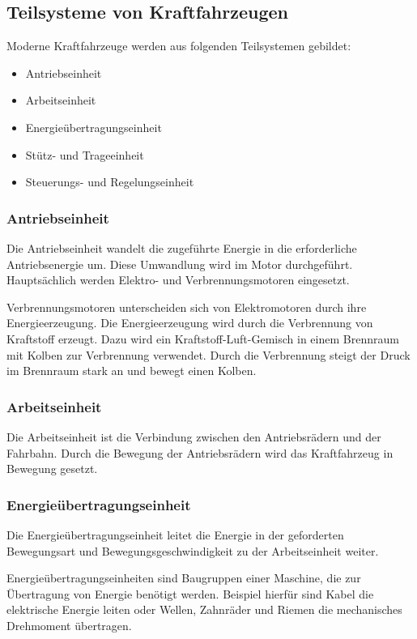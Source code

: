 \subsection{Teilsysteme von Kraftfahrzeugen}
Moderne Kraftfahrzeuge werden aus folgenden Teilsystemen gebildet:
\begin{itemize}
	\item Antriebseinheit
	\item Arbeitseinheit
	\item Energieübertragungseinheit
	\item Stütz- und Trageeinheit
	\item Steuerungs- und Regelungseinheit
\end{itemize}


\subsubsection{Antriebseinheit}
Die Antriebseinheit wandelt die zugeführte Energie in die erforderliche Antriebsenergie um.
Diese Umwandlung wird im Motor durchgeführt.
Hauptsächlich werden Elektro- und Verbrennungsmotoren eingesetzt.

Verbrennungsmotoren unterscheiden sich von Elektromotoren durch ihre Energieerzeugung.
Die Energieerzeugung wird durch die Verbrennung von Kraftstoff erzeugt.
Dazu wird ein Kraftstoff-Luft-Gemisch in einem Brennraum mit Kolben zur Verbrennung verwendet.
Durch die Verbrennung steigt der Druck im Brennraum stark an und bewegt einen Kolben.

\subsubsection{Arbeitseinheit}
Die Arbeitseinheit ist die Verbindung zwischen den Antriebsrädern und der Fahrbahn.
Durch die Bewegung der Antriebsrädern wird das Kraftfahrzeug in Bewegung gesetzt.

\subsubsection{Energieübertragungseinheit}
Die Energieübertragungseinheit leitet die Energie in der geforderten Bewegungsart und Bewegungsgeschwindigkeit zu der Arbeitseinheit weiter.

Energieübertragungseinheiten sind Baugruppen einer Maschine, die zur Übertragung von Energie benötigt werden.
Beispiel hierfür sind Kabel die elektrische Energie leiten oder Wellen, Zahnräder und Riemen die mechanisches Drehmoment übertragen.

